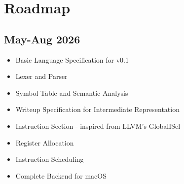 \documentclass[11pt]{article}
\begin{document}
\section{Roadmap}
\subsection{May-Aug 2026}
\begin{itemize}
  \item Basic Language Specification for v0.1
  \item Lexer and Parser
  \item Symbol Table and Semantic Analysis
  \item Writeup Specification for Intermediate Representation
  \item Instruction Section - inspired from LLVM's GlobalISel
  \item Register Allocation
  \item Instruction Scheduling
  \item Complete Backend for macOS
\end{itemize}
\end{document}
